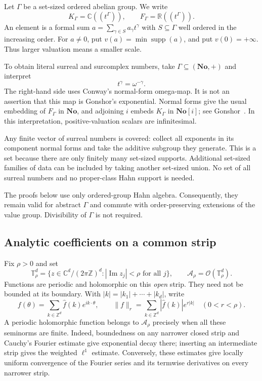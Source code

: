 \documentclass[11pt,letterpaper]{article}
\theoremstyle{definition}
\theoremstyle{remark}
\newcommand{\No}{\mathbf{No}}
\newcommand{\R}{\mathbb R}
\newcommand{\C}{\mathbb C}
\newcommand{\Z}{\mathbb Z}
\newcommand{\T}{\mathbb T}
\newcommand{\A}{\mathcal A}
\newcommand{\supp}{\operatorname{supp}}
\newcommand{\im}{\operatorname{Im}}
\numberwithin{equation}{section}
\begin{document}
Let $\Gamma$ be a set-sized ordered abelian group.  We write
\[
 K_\Gamma=\C((t^\Gamma)),\qquad
 F_\Gamma=\R((t^\Gamma)).
\]
An element is a formal sum $a=\sum_{\gamma\in S}a_\gamma t^\gamma$ with
$S\subseteq\Gamma$ well ordered in the increasing order.  For $a\ne0$, put
$v(a)=\min\supp(a)$, and put $v(0)=+\infty$.  Thus larger valuation means a
smaller scale.

To obtain literal surreal and surcomplex numbers, take
$\Gamma\subseteq(\No,+)$ and interpret
\begin{equation}\label{eq:omega-map}
 t^\gamma=\omega^{-\gamma}.
\end{equation}
The right-hand side uses Conway's normal-form omega-map.  It is not an
assertion that this map is Gonshor's exponential.  Normal forms give the
usual embedding of $F_\Gamma$ in $\No$, and adjoining $i$ embeds $K_\Gamma$ in
$\No[i]$; see Gonshor~\cite{gonshor}.  In this interpretation, positive-valuation
scalars are infinitesimal.

Any finite vector of surreal numbers is covered: collect all exponents in
its component normal forms and take the additive subgroup they generate.
This is a set because there are only finitely many set-sized supports.
Additional set-sized families of data can be included by taking another
set-sized union.  No set of all surreal numbers and no proper-class Hahn
support is needed.

The proofs below use only ordered-group Hahn algebra.  Consequently, they
remain valid for abstract $\Gamma$ and commute with order-preserving
extensions of the value group.  Divisibility of $\Gamma$ is not required.

\subsection{Analytic coefficients on a common strip}

Fix $\rho>0$ and set
\[
 \T^d_\rho=\{z\in\C^d/(2\pi\Z)^d:
                 |\im z_j|<\rho\text{ for all }j\},
 \qquad \A_\rho=\mathcal O(\T^d_\rho).
\]
Functions are periodic and holomorphic on this \emph{open} strip.  They need
not be bounded at its boundary.  With
$|k|=|k_1|+\cdots+|k_d|$, write
\[
 f(\theta)=\sum_{k\in\Z^d}\widehat f(k)e^{ik\cdot\theta},
 \qquad
 \|f\|_r=\sum_{k\in\Z^d}|\widehat f(k)|e^{r|k|}
 \quad(0<r<\rho).
\]
A periodic holomorphic function belongs to $\A_\rho$ precisely when all these
seminorms are finite.  Indeed, boundedness on any narrower closed strip and
Cauchy's Fourier estimate give exponential decay there; inserting an
intermediate strip gives the weighted $\ell^1$ estimate.  Conversely, these
estimates give locally uniform convergence of the Fourier series and its
termwise derivatives on every narrower strip.
\end{document}
